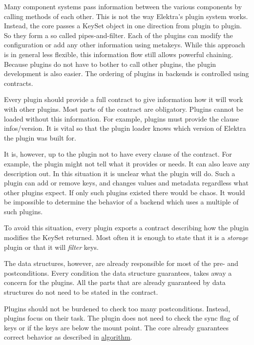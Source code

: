 Many component systems pass information between the various components by calling methods of each other. This is not the way Elektra’s plugin system works. Instead, the core passes a {\ttfamily Key\+Set} object in one direction from plugin to plugin. So they form a so called pipes-\/and-\/filter. Each of the plugins can modify the configuration or add any other information using metakeys. While this approach is in general less flexible, this information flow still allows powerful chaining. Because plugins do not have to bother to call other plugins, the plugin development is also easier. The ordering of plugins in backends is controlled using contracts.

Every plugin should provide a full contract to give information how it will work with other plugins. Most parts of the contract are obligatory. Plugins cannot be loaded without this information. For example, plugins must provide the clause {\ttfamily infos/version}. It is vital so that the plugin loader knows which version of Elektra the plugin was built for.

It is, however, up to the plugin not to have every clause of the contract. For example, the plugin might not tell what it provides or needs. It can also leave any description out. In this situation it is unclear what the plugin will do. Such a plugin can add or remove keys, and changes values and metadata regardless what other plugins expect. If only such plugins existed there would be chaos. It would be impossible to determine the behavior of a backend which uses a multiple of such plugins.

To avoid this situation, every plugin exports a contract describing how the plugin modifies the {\ttfamily Key\+Set} {\ttfamily returned}. Most often it is enough to state that it is a {\itshape storage} plugin or that it will {\itshape filter} keys.

The data structures, however, are already responsible for most of the pre-\/ and postconditions. Every condition the data structure guarantees, takes away a concern for the plugins. All the parts that are already guaranteed by data structures do not need to be stated in the contract.

Plugins should not be burdened to check too many postconditions. Instead, plugins focus on their task. The plugin does not need to check the sync flag of keys or if the keys are below the mount point. The core already guarantees correct behavior as described in \hyperlink{doc_dev_algorithm_md}{algorithm}.

